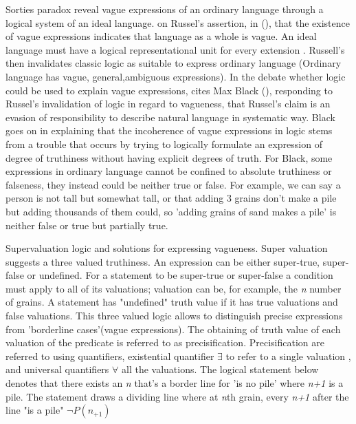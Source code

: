 Sorties paradox reveal vague expressions of an ordinary language through a logical system of an ideal language. \cite{williamson2002vagueness} on Russel's assertion, in (\cite{russell1923vagueness}), that the existence of vague expressions indicates that language as a whole is vague. An ideal language must have a logical representational unit for every extension \cite{quine2011two}. Russell's then invalidates classic logic as suitable to express ordinary language (Ordinary language has vague, general,ambiguous expressions). In the debate whether logic could be used to explain vague expressions, \cite{williamson2002vagueness} cites Max Black (\cite{black1937vagueness}), responding to Russel's invalidation of logic in regard to vagueness, that Russel's claim is an evasion of responsibility to  describe natural language in systematic way. Black goes on in explaining that the incoherence of vague expressions in logic stems from a trouble that occurs by trying to logically formulate an expression of degree of truthiness without having explicit degrees of truth.  For Black, some expressions in ordinary language cannot be confined to absolute truthiness or falseness, they instead could be neither true or false. For example, we can say a person is not tall but somewhat tall, or that adding 3 grains don't make a pile but adding thousands of them could, so 'adding grains of sand makes a pile' is neither false or true but partially true. 


Supervaluation logic and  solutions for expressing vagueness. Super valuation suggests a three valued truthiness. An expression can be either super-true, super-false or undefined. For a statement to be super-true or super-false a condition must apply to all of its valuations; valuation can be, for example, the \emph{n} number of grains. A statement has "undefined" truth value if it has true valuations and false valuations. This three valued logic allows to distinguish precise expressions from 'borderline cases'(vague expressions). The obtaining of truth value of each valuation of the predicate is referred to as precisification. Precisification are referred to using quantifiers, existential quantifier $ \exists $ to refer to a single valuation ,  and universal quantifiers  $ \forall $ all the valuations. The logical statement below denotes that there exists an \emph{n} that's a border line for 'is no pile' where \emph{n+1} is a pile. The statement  draws a dividing line where at \emph{n}th grain, every \emph{n+1} after the line "is a pile" $\neg P( n_{+1}) $ 

